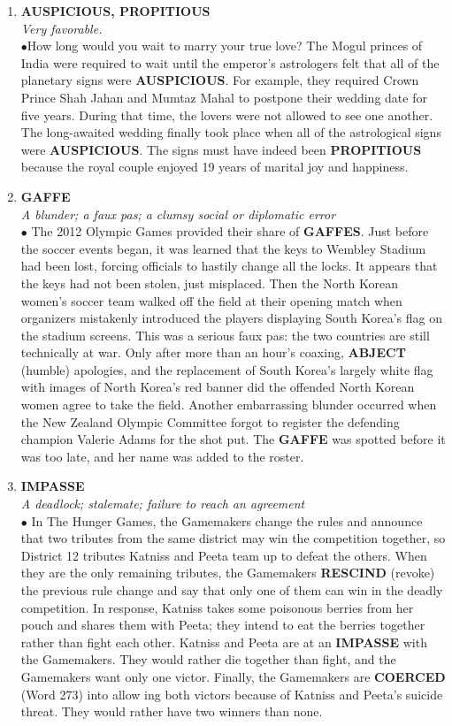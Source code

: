 \documentclass{book}
\begin{document}
\begin{enumerate}
\item \textbf{AUSPICIOUS, PROPITIOUS}\\
\textit{Very  favorable.}\\

$\bullet$How long would you wait to marry your true love? The Mogul princes of India were required to wait until the emperor's astrologers felt that all of the planetary signs were \textbf{AUSPICIOUS}. For example, they required Crown Prince Shah Jahan and Mumtaz Mahal to postpone their wedding date for five years. During that time, the lovers were not allowed to see one another. The long-awaited wedding finally took place when all of the astrological signs were \textbf{ AUSPICIOUS}. The signs must have indeed been \textbf{PROPITIOUS} because the royal couple enjoyed 19 years of marital joy and happiness.
\item  \textbf{GAFFE}\\ 
\textit{A blunder; a faux pas; a clumsy social or diplomatic error}\\

$\bullet$ The 2012 Olympic Games provided their share of \textbf{GAFFES}. Just before the soccer events began, it was learned that the keys to Wembley Stadium had been lost, forcing officials to hastily change all the locks. It appears that the keys had not been stolen, just misplaced. Then the North Korean women's soccer team walked off the field at their opening match when organizers mistakenly introduced the players displaying South Korea's flag on the stadium screens. This was a serious faux pas: the two countries are still technically at war. Only after more than an hour's coaxing, \textbf{ABJECT} (humble) apologies, and the replacement of South Korea's largely white flag with images of North Korea's red banner did the offended North Korean women agree to take the field. Another embarrassing blunder occurred when the New Zealand Olympic Committee forgot to register the defending champion Valerie Adams for the shot put. The \textbf{GAFFE} was spotted before it was too late, and her name was added to the roster.
\item \textbf{IMPASSE}\\ 
\textit{A deadlock; stalemate; failure to reach an agreement}\\

$\bullet$ In The Hunger Games, the Gamemakers change the rules and announce that two tributes from the same district may win the competition together, so District 12 tributes Katniss and Peeta team up to defeat the others. When they are the only remaining tributes, the Gamemakers \textbf{RESCIND} (revoke) the previous rule change and say that only one of them can win in the deadly competition. In response, Katniss takes some poisonous berries from her pouch and shares them with Peeta; they intend to eat the berries together rather than fight each other. Katniss and Peeta are at an \textbf{IMPASSE} with the Gamemakers. They would rather die together than fight, and the Gamemakers want only one victor. Finally, the Gamemakers are \textbf{COERCED} (Word 273) into allow ing both victors because of Katniss and Peeta's suicide threat. They would rather have two winners than none.


\end{enumerate}
\end{document}
